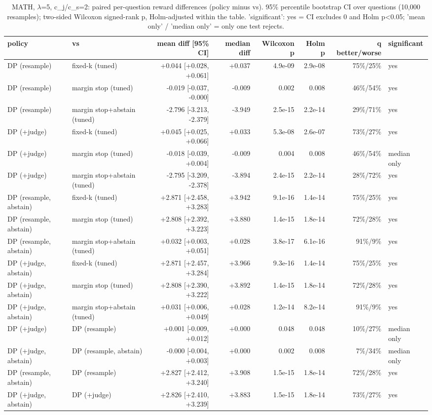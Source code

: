 \begin{table}[t]
\centering
\small
\caption{MATH, $\lambda$=5, c\_j/c\_s=2: paired per-question reward differences (policy minus vs). 95\% percentile bootstrap CI over questions (10,000 resamples); two-sided Wilcoxon signed-rank p, Holm-adjusted within the table. 'significant': yes = CI excludes 0 and Holm p<0.05; 'mean only' / 'median only' = only one test rejects.}
\label{tab:significance_math_lam5}
\begin{tabular}{llrrrrrl}
\toprule
policy & vs & mean diff [95\% CI] & median diff & Wilcoxon p & Holm p & q better/worse & significant \\
\midrule
DP (resample) & fixed-k (tuned) & +0.044 [+0.028, +0.061] & +0.037 & 4.9e-09 & 2.9e-08 & 75\%/25\% & yes \\
DP (resample) & margin stop (tuned) & -0.019 [-0.037, -0.000] & -0.009 & 0.002 & 0.008 & 46\%/54\% & yes \\
DP (resample) & margin stop+abstain (tuned) & -2.796 [-3.213, -2.379] & -3.949 & 2.5e-15 & 2.2e-14 & 29\%/71\% & yes \\
DP (+judge) & fixed-k (tuned) & +0.045 [+0.025, +0.066] & +0.033 & 5.3e-08 & 2.6e-07 & 73\%/27\% & yes \\
DP (+judge) & margin stop (tuned) & -0.018 [-0.039, +0.004] & -0.009 & 0.004 & 0.008 & 46\%/54\% & median only \\
DP (+judge) & margin stop+abstain (tuned) & -2.795 [-3.209, -2.378] & -3.894 & 2.4e-15 & 2.2e-14 & 28\%/72\% & yes \\
DP (resample, abstain) & fixed-k (tuned) & +2.871 [+2.458, +3.283] & +3.942 & 9.1e-16 & 1.4e-14 & 75\%/25\% & yes \\
DP (resample, abstain) & margin stop (tuned) & +2.808 [+2.392, +3.223] & +3.880 & 1.4e-15 & 1.8e-14 & 72\%/28\% & yes \\
DP (resample, abstain) & margin stop+abstain (tuned) & +0.032 [+0.003, +0.051] & +0.028 & 3.8e-17 & 6.1e-16 & 91\%/9\% & yes \\
DP (+judge, abstain) & fixed-k (tuned) & +2.871 [+2.457, +3.284] & +3.966 & 9.3e-16 & 1.4e-14 & 75\%/25\% & yes \\
DP (+judge, abstain) & margin stop (tuned) & +2.808 [+2.390, +3.222] & +3.892 & 1.4e-15 & 1.8e-14 & 72\%/28\% & yes \\
DP (+judge, abstain) & margin stop+abstain (tuned) & +0.031 [+0.006, +0.049] & +0.028 & 1.2e-14 & 8.2e-14 & 91\%/9\% & yes \\
DP (+judge) & DP (resample) & +0.001 [-0.009, +0.012] & +0.000 & 0.048 & 0.048 & 10\%/27\% & median only \\
DP (+judge, abstain) & DP (resample, abstain) & -0.000 [-0.004, +0.003] & +0.000 & 0.002 & 0.008 & 7\%/34\% & median only \\
DP (resample, abstain) & DP (resample) & +2.827 [+2.412, +3.240] & +3.908 & 1.5e-15 & 1.8e-14 & 72\%/28\% & yes \\
DP (+judge, abstain) & DP (+judge) & +2.826 [+2.410, +3.239] & +3.883 & 1.5e-15 & 1.8e-14 & 73\%/27\% & yes \\
\bottomrule
\end{tabular}
\end{table}
